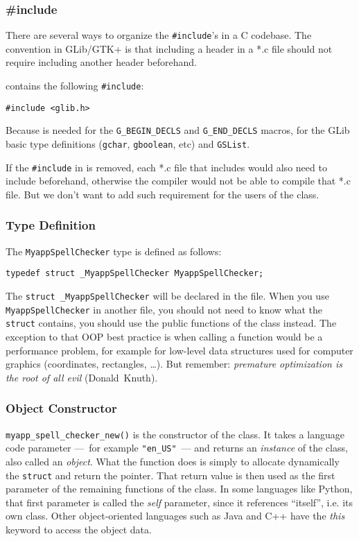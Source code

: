 \subsubsection{\#include}
\label{oop-include-in-header}
There are several ways to organize the \lstinline{#include}'s in a C codebase. The convention in GLib/GTK+ is that including a header in a *.c file should not require including another header beforehand.

 contains the following \lstinline{#include}:
\begin{lstlisting}
#include <glib.h>
\end{lstlisting}

Because  is needed for the \lstinline{G_BEGIN_DECLS} and \lstinline{G_END_DECLS} macros, for the GLib basic type definitions (\lstinline{gchar}, \lstinline{gboolean}, etc) and \lstinline{GSList}.

If the \lstinline{#include} in  is removed, each *.c file that includes  would also need to include  beforehand, otherwise the compiler would not be able to compile that *.c file. But we don't want to add such requirement for the users of the class.

\subsubsection{Type Definition}
The \lstinline{MyappSpellChecker} type is defined as follows:

\begin{lstlisting}
typedef struct _MyappSpellChecker MyappSpellChecker;
\end{lstlisting}

The \lstinline{struct _MyappSpellChecker} will be declared in the  file. When you use \lstinline{MyappSpellChecker} in another file, you should not need to know what the \lstinline{struct} contains, you should use the public functions of the class instead. The exception to that OOP best practice is when calling a function would be a performance problem, for example for low-level data structures used for computer graphics (coordinates, rectangles, …). But remember: \emph{premature optimization is the root of all evil} (Donald~Knuth).

\subsubsection{Object Constructor}
\lstinline{myapp_spell_checker_new()} is the constructor of the class. It takes a language code parameter ---~for example \lstinline{"en_US"}~--- and returns an \emph{instance} of the class, also called an \emph{object}. What the function does is simply to allocate dynamically the \lstinline{struct} and return the pointer. That return value is then used as the first parameter of the remaining functions of the class. In some languages like Python, that first parameter is called the \emph{self} parameter, since it references ``itself'', i.e. its own class. Other object-oriented languages such as Java and C++ have the \emph{this} keyword to access the object data.

